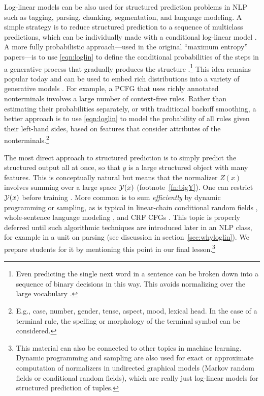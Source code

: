 \documentclass[11pt,letterpaper]{article}
\begin{document}
Log-linear models can be also used for structured prediction problems
in NLP such as tagging, parsing, chunking, segmentation, and language
modeling.  A simple strategy is to reduce structured prediction to a
sequence of multiclass predictions, which can be individually made
with a conditional log-linear model \cite{ratnaparkhi-1998}.  A more
fully probabilistic approach---used in the original ``maximum
entropy'' papers---is to use \eqref{eqn:loglin} to define the
conditional probabilities of the steps in a generative process that
gradually produces the structure
\cite{rosenfeld-1994,berger-dellapietra-dellapietra-1996}.\footnote{Even
  predicting the single next word in a sentence can be broken down into a
  sequence of binary decisions in this way.  This avoids normalizing over the
  large vocabulary \cite{mnih-hinton-2008}.}  This idea
remains popular today and can be used to embed rich distributions into
a variety of generative models \cite{bergkirkpatrick-et-al-2010}.  For
example, a PCFG that uses richly annotated nonterminals involves a
large number of context-free rules.  Rather than estimating their
probabilities separately, or with traditional backoff smoothing, a
better approach is to use \eqref{eqn:loglin} to model the probability
of all rules given their left-hand sides, based on features that
consider attributes of the nonterminals.\footnote{E.g., case, number,
  gender, tense, aspect, mood, lexical head.  In the case of a
  terminal rule, the spelling or morphology of the terminal symbol can
  be considered.}

The most direct approach to structured prediction is to simply predict
the structured output all at once, so that $y$ is a large structured
object with many features.  This is conceptually natural but means
that the normalizer $Z(x)$ involves summing over a large space ${\cal
  Y}(x)$ (footnote~\ref{fn:bigY}).  One can restrict ${\cal Y}(x)$
before training \cite{johnson-et-al-1999}.  More common is to sum {\em
  efficiently} by dynamic programming or sampling, as is typical in
linear-chain conditional random fields
\cite{lafferty-mccallum-pereira-2001}, whole-sentence language
modeling \cite{rosenfeld-chen-zhu-2001}, and CRF CFGs
\cite{finkel2008efficient}.  This topic is properly deferred until
such algorithmic techniques are introduced later in an NLP class, for
example in a unit on parsing (see discussion in
section~\ref{sec:whyloglin}).  We prepare students for it by
mentioning this point in our final lesson.\footnote{This material can
  also be connected to other topics in machine learning.  Dynamic
  programming and sampling are also used for exact or approximate
  computation of normalizers in undirected graphical models (Markov
  random fields or conditional random fields), which are really just
  log-linear models for structured prediction of tuples.}
\end{document}
